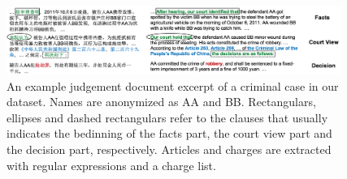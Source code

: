

\begin{figure}[t!]
\begin{center}
\includegraphics[width=0.97\textwidth]{figures/case.png}	
\caption{An example judgement document excerpt of a criminal case in our dataset. Names are anonymized as AA and BB.
Rectangulars, ellipses and dashed rectangulars refer to the clauses that usually indicates the bedinning of the facts part, the court view part and the decision part, respectively. Articles and charges are extracted with regular expressions and a charge list.
}
\label{fig_example_case}
\end{center}
\end{figure}

